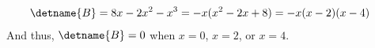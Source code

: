 %
\begin{align*}
\detname{B} 
&= 8x -2x^2 - x^3
= -x(x^2 - 2x + 8)
= -x(x-2)(x-4)
\end{align*}
%
And thus, $\detname{B}=0$ when $x = 0$, $x = 2$, or $x = 4$.